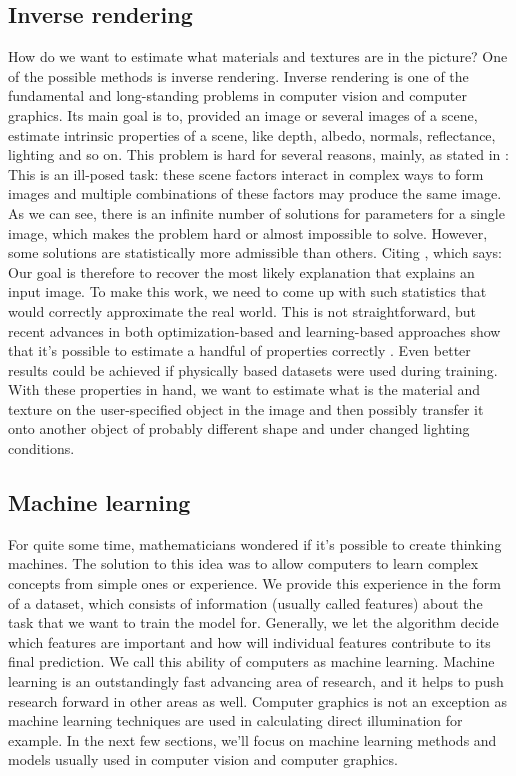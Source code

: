     \subsection{Inverse rendering}
    How do we want to estimate what materials and textures are in the picture? One of the possible methods is inverse rendering. Inverse rendering is one of the fundamental and long-standing problems in computer vision and computer graphics. Its main goal is to, provided an image or several images of a scene, estimate intrinsic properties of a scene, like depth, albedo, normals, reflectance, lighting and so on. This problem is hard for several reasons, mainly, as stated in \cite{li-inverse-rendering}: \glqq{}This is an ill-posed task: these scene factors interact in complex ways to form images and multiple combinations of these factors may produce the same image.\grqq{} As we can see, there is an infinite number of solutions for parameters for a single image, which makes the problem hard or almost impossible to solve. However, some solutions are statistically more admissible than others. Citing \cite{BarronTPAMI2015}, which says: \glqq{}Our goal is therefore to recover the most likely explanation that explains an input image.\grqq{} To make this work, we need to come up with such statistics that would correctly approximate the real world. This is not straightforward, but recent advances in both optimization-based and learning-based approaches show that it's possible to estimate a handful of properties correctly \cite{sengupta-inverse-rendering}\cite{li-inverse-rendering}\cite{BarronTPAMI2015}. Even better results could be achieved if physically based datasets were used during training. With these properties in hand, we want to estimate what is the material and texture on the user-specified object in the image and then possibly transfer it onto another object of probably different shape and under changed lighting conditions.
    \subsection{Machine learning}
    For quite some time, mathematicians wondered if it's possible to create thinking machines. The solution to this idea was to allow computers to learn complex concepts from simple ones or experience. We provide this experience in the form of a dataset, which consists of information (usually called features) about the task that we want to train the model for. Generally, we let the algorithm decide which features are important and how will individual features contribute to its final prediction. We call this ability of computers as machine learning. Machine learning is an outstandingly fast advancing area of research, and it helps to push research forward in other areas as well. Computer graphics is not an exception as machine learning techniques are used in calculating direct illumination \cite{Vevoda-rendering} for example.
    \newline
    In the next few sections, we'll focus on machine learning methods and models usually used in computer vision and computer graphics.
